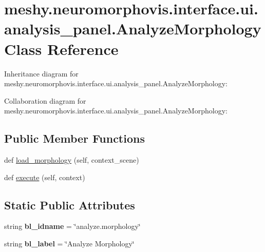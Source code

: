 \hypertarget{classmeshy_1_1neuromorphovis_1_1interface_1_1ui_1_1analysis__panel_1_1AnalyzeMorphology}{}\section{meshy.\+neuromorphovis.\+interface.\+ui.\+analysis\+\_\+panel.\+Analyze\+Morphology Class Reference}
\label{classmeshy_1_1neuromorphovis_1_1interface_1_1ui_1_1analysis__panel_1_1AnalyzeMorphology}


Inheritance diagram for meshy.\+neuromorphovis.\+interface.\+ui.\+analysis\+\_\+panel.\+Analyze\+Morphology\+:


Collaboration diagram for meshy.\+neuromorphovis.\+interface.\+ui.\+analysis\+\_\+panel.\+Analyze\+Morphology\+:
\subsection*{Public Member Functions}
\begin{DoxyCompactItemize}
\item 
def \hyperlink{classmeshy_1_1neuromorphovis_1_1interface_1_1ui_1_1analysis__panel_1_1AnalyzeMorphology_a11a14fc85271630cf67b54ad068fedc2}{load\+\_\+morphology} (self, context\+\_\+scene)
\item 
def \hyperlink{classmeshy_1_1neuromorphovis_1_1interface_1_1ui_1_1analysis__panel_1_1AnalyzeMorphology_ac596ba43b9bc89ef7660164b27286799}{execute} (self, context)
\end{DoxyCompactItemize}
\subsection*{Static Public Attributes}
\begin{DoxyCompactItemize}
\item 
string {\bfseries bl\+\_\+idname} = \char`\"{}analyze.\+morphology\char`\"{}\hypertarget{classmeshy_1_1neuromorphovis_1_1interface_1_1ui_1_1analysis__panel_1_1AnalyzeMorphology_a25b6cf784679bd92675fcacf45646dc9}{}\label{classmeshy_1_1neuromorphovis_1_1interface_1_1ui_1_1analysis__panel_1_1AnalyzeMorphology_a25b6cf784679bd92675fcacf45646dc9}

\item 
string {\bfseries bl\+\_\+label} = \char`\"{}Analyze Morphology\char`\"{}\hypertarget{classmeshy_1_1neuromorphovis_1_1interface_1_1ui_1_1analysis__panel_1_1AnalyzeMorphology_a0b819f7465b898287de05d97d78e6e9e}{}\label{classmeshy_1_1neuromorphovis_1_1interface_1_1ui_1_1analysis__panel_1_1AnalyzeMorphology_a0b819f7465b898287de05d97d78e6e9e}

\end{DoxyCompactItemize}


